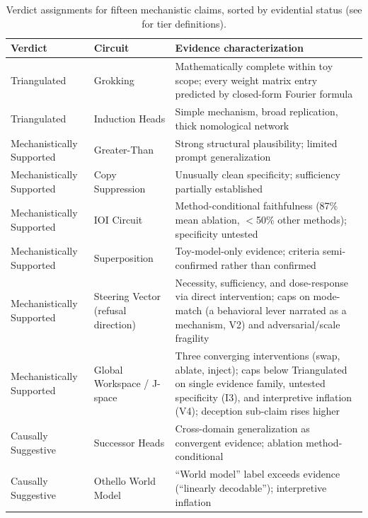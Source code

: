 \documentclass{article}
\begin{document}
\begin{table}[H]
\centering
\small
\caption{Verdict assignments for fifteen mechanistic claims, sorted by evidential status (see  for tier definitions).}
\label{tab:case-studies}
\renewcommand{\arraystretch}{1.2}
\begin{tabular}{@{}l>{\raggedright\arraybackslash}p{3cm}>{\raggedright\arraybackslash}p{7cm}@{}}
\toprule
\textbf{Verdict} & \textbf{Circuit} & \textbf{Evidence characterization} \\
\midrule
Triangulated & Grokking \citep{nanda2023progress} & Mathematically complete within toy scope; every weight matrix entry predicted by closed-form Fourier formula \\
\midrule
Triangulated & Induction Heads \citep{olsson2022context} & Simple mechanism, broad replication, thick nomological network \\
\midrule
Mechanistically Supported & Greater-Than \citep{hanna2023greater} & Strong structural plausibility; limited prompt generalization \\
\midrule
Mechanistically Supported & Copy Suppression \citep{mcdougall2023copy} & Unusually clean specificity; sufficiency partially established \\
\midrule
Mechanistically Supported & IOI Circuit \citep{wang2023interpretability} & Method-conditional faithfulness (87\% mean ablation, $<$50\% other methods); specificity untested \\
\midrule
Mechanistically Supported & Superposition \citep{elhage2022superposition} & Toy-model-only evidence; criteria semi-confirmed rather than confirmed \\
\midrule
Mechanistically Supported & Steering Vector (refusal direction) \citep{arditi2024refusal} & Necessity, sufficiency, and dose-response via direct intervention; caps on mode-match (a behavioral lever narrated as a mechanism, V2) and adversarial/scale fragility \\
\midrule
Mechanistically Supported & Global Workspace / J-space \citep{anthropic2026workspace} & Three converging interventions (swap, ablate, inject); caps below Triangulated on single evidence family, untested specificity (I3), and interpretive inflation (V4); deception sub-claim rises higher \\
\midrule
Causally Suggestive & Successor Heads \citep{gould2023successor} & Cross-domain generalization as convergent evidence; ablation method-conditional \\
\midrule
Causally Suggestive & Othello World Model \citep{li2023othello} & ``World model'' label exceeds evidence (``linearly decodable''); interpretive inflation \\

\end{tabular}
\end{table}
\end{document}
